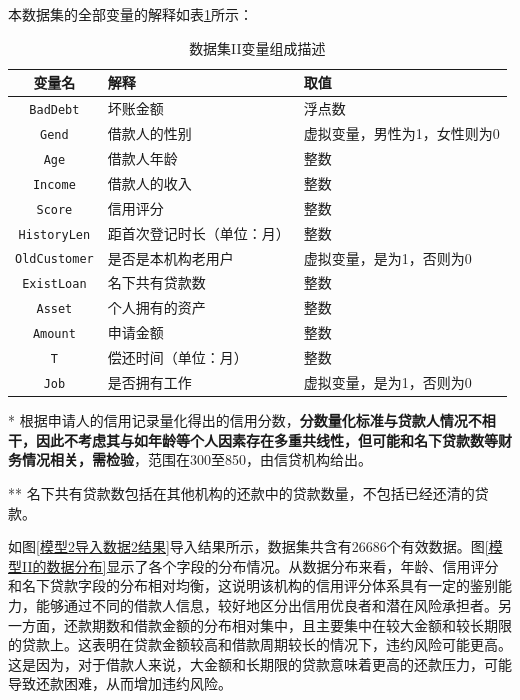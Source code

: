 \documentclass[13.5pt,hyperref,a4paper,UTF8]{ctexart}
\begin{document}
本数据集的全部变量的解释如表\ref{数据集II变量组成描述}所示：
\begin{table}[!htbp]
    \setlength{\belowcaptionskip}{0.2cm}
    \centering
    \caption{数据集II变量组成描述}
    \begin{threeparttable}
    \begin{tabular}{c  | p{5cm} |p{7cm}}
    \hline
        \textbf{变量名} & \textbf{解释} & \textbf{取值} \\
        \hline
        \texttt{BadDebt}  & 坏账金额 & 浮点数 \\
        \texttt{Gend}  & 借款人的性别 & 虚拟变量，男性为1，女性则为0 \\
        \texttt{Age}  & 借款人年龄  &整数 \\
        \texttt{Income}  & 借款人的收入 & 整数 \\
        \texttt{Score}  & 信用评分\tnote{*} & 整数 \\
        \texttt{HistoryLen}  & 距首次登记时长（单位：月） & 整数 \\
        \texttt{OldCustomer}  & 是否是本机构老用户 & 虚拟变量，是为1，否则为0 \\
        \texttt{ExistLoan}  & 名下共有贷款数\tnote{**} & 整数 \\
        \texttt{Asset}  & 个人拥有的资产 & 整数 \\
         \texttt{Amount}  & 申请金额 & 整数 \\
         \texttt{T}  & 偿还时间（单位：月） & 整数 \\
         \texttt{Job}  & 是否拥有工作 & 虚拟变量，是为1，否则为0 \\
        \hline
    \end{tabular}
    \label{数据集II变量组成描述}
     \begin{tablenotes}
        \footnotesize
        \item[*] 根据申请人的信用记录量化得出的信用分数，\textbf{分数量化标准与贷款人情况不相干，因此不考虑其与如年龄等个人因素存在多重共线性，但可能和名下贷款数等财务情况相关，需检验}，范围在300至850，由信贷机构给出。
         \item[**] 名下共有贷款数包括在其他机构的还款中的贷款数量，不包括已经还清的贷款。

      \end{tablenotes}
    \end{threeparttable}
\end{table}

如图\ref{模型2导入数据2结果}导入结果所示，数据集共含有26686个有效数据。图\ref{模型II的数据分布}显示了各个字段的分布情况。从数据分布来看，年龄、信用评分和名下贷款字段的分布相对均衡，这说明该机构的信用评分体系具有一定的鉴别能力，能够通过不同的借款人信息，较好地区分出信用优良者和潜在风险承担者。另一方面，还款期数和借款金额的分布相对集中，且主要集中在较大金额和较长期限的贷款上。这表明在贷款金额较高和借款周期较长的情况下，违约风险可能更高。这是因为，对于借款人来说，大金额和长期限的贷款意味着更高的还款压力，可能导致还款困难，从而增加违约风险。
\end{document}
